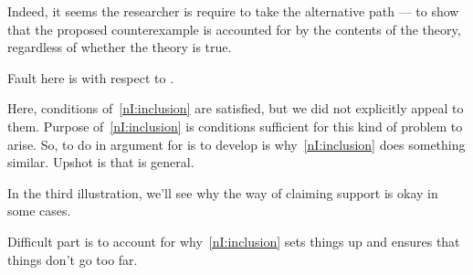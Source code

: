 \begin{note}
  Indeed, it seems the researcher is require to take the alternative path --- to show that the proposed counterexample is accounted for by the contents of the theory, regardless of whether the theory is true.

  Fault here is with respect to \eiS{}.
  {
    \color{red}
    Here, conditions of~\ref{nI:inclusion} are satisfied, but we did not explicitly appeal to them.
    Purpose of~\ref{nI:inclusion} is conditions sufficient for this kind of problem to arise.
    So, to do in argument for \nI{} is to develop is why~\ref{nI:inclusion} does something similar.
    Upshot is that \nI{} is general.

    In the third illustration, we'll see why the way of claiming support is okay in some cases.
  }
  Difficult part is to account for why~\ref{nI:inclusion} sets things up and ensures that things don't go too far.
\end{note}

